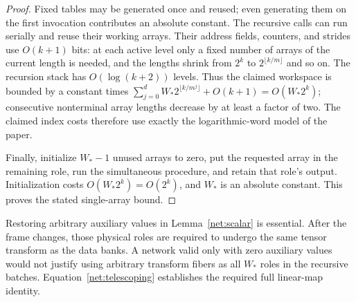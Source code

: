 \begin{proof}
Fixed tables may be generated once and reused; even generating
them on the first invocation contributes an absolute constant.
The recursive calls can run serially and reuse their working
arrays.  Their address fields, counters, and strides use
$O(k+1)$ bits: at each active level only a fixed number of
arrays of the current length is needed, and the lengths shrink
from $2^k$ to $2^{\lfloor k/m\rfloor}$ and so on.
The recursion stack has $O(\log(k+2))$ levels.  Thus the claimed
workspace is bounded by a constant times
$\sum_{j=0}^{d}W_*2^{\lfloor k/m^j\rfloor}+O(k+1)
=O(W_*2^k)$; consecutive nonterminal array lengths decrease
by at least a factor of two.  The claimed index costs therefore
use exactly the logarithmic-word model of the paper.

Finally, initialize $W_*-1$ unused arrays to zero, put the
requested array in the remaining role, run the simultaneous
procedure, and retain that role's output.  Initialization costs
$O(W_*2^k)=O(2^k)$, and $W_*$ is an absolute constant.  This
proves the stated single-array bound.
\end{proof}

\begin{remark}\label{net:role-remark}
Restoring arbitrary auxiliary values in Lemma~\ref{net:scalar}
is essential.  After the frame changes, those physical roles
are required to undergo the same tensor transform as the data
banks.  A network valid only with zero auxiliary values would
not justify using arbitrary transform fibers as all $W_*$ roles
in the recursive batches.  Equation~\eqref{net:telescoping}
establishes the required full linear-map identity.
\end{remark}
